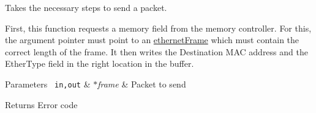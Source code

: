 Takes the necessary steps to send a packet. 

First, this function requests a memory field from the memory controller. For this, the argument pointer must point to an \mbox{\hyperlink{structethernet_frame}{ethernet\+Frame}} which must contain the correct length of the frame. It then writes the Destination M\+AC address and the Ether\+Type field in the right location in the buffer. 
\begin{DoxyParams}[1]{Parameters}
\mbox{\texttt{ in,out}}  & {\em $\ast$frame} & Packet to send \\
\hline
\end{DoxyParams}
\begin{DoxyReturn}{Returns}
Error code 
\end{DoxyReturn}
